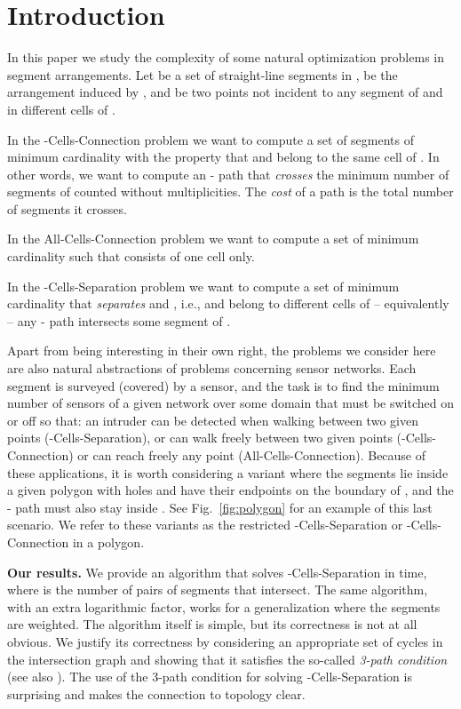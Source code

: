 \documentclass[11pt,a4paper]{article}
\begin{document}
\section{Introduction}

In this paper we study the complexity of some natural optimization problems in segment arrangements. Let  be a set of straight-line segments in ,  be the arrangement induced by , and  be two points not incident to any segment of  and in different cells of .

In the {\sc -Cells-Connection} problem we want to compute a set of segments  of minimum cardinality with the property that  and  belong to the same cell of . 
In other words, we want to compute 
an - path that \emph{crosses} the minimum number of segments of  counted without multiplicities.
The \emph{cost} of a path is the total number of segments it crosses.

In the {\sc All-Cells-Connection} problem we want to compute a set  of minimum cardinality such that  consists of one cell only.

In the {\sc -Cells-Separation} problem we want to compute a set  of minimum cardinality that \emph{separates}  and , i.e.,  and  belong to different cells of  -- equivalently -- any - path intersects some segment of . 

Apart from being interesting in their own right, the problems we consider here are also natural abstractions of problems concerning sensor networks. Each segment is surveyed (covered) by a sensor, and the task is to find the minimum number of sensors of a given network over some domain that must be switched on or off so that: an intruder can be detected when walking between two given points ({\sc -Cells-Separation}), or can walk freely between two given points ({\sc -Cells-Connection}) or can reach freely any point ({\sc All-Cells-Connection}). Because of these applications, it is worth considering a variant where the segments lie inside a given polygon  with holes and have their endpoints on the boundary of , and the - path must also stay inside . See Fig.~\ref{fig:polygon} for an example of this last scenario. We refer to these variants as the restricted {\sc -Cells-Separation} or {\sc -Cells-Connection} in a polygon.

\medskip
\noindent
{\bf Our results.} We provide an algorithm that solves {\sc -Cells-Separation} in  time, where  is the number of pairs of segments that intersect. The same algorithm, with an extra logarithmic factor, works for a generalization where the segments are weighted. The algorithm itself is simple, but its correctness is not at all obvious. We justify its correctness by considering an appropriate set of cycles in the intersection graph and showing that it satisfies the so-called \emph{3-path condition}~\cite{t-egsnc-90} (see also \cite[Chapter 4]{mt-gs-01}). The use of the 3-path condition for solving {\sc -Cells-Separation} is surprising and makes the connection to topology clear. 
\end{document}
